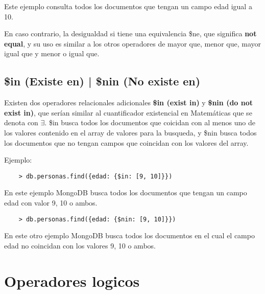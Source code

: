 Este ejemplo consulta todos los documentos que tengan un campo edad igual a 10.

En caso contrario, la desigualdad si tiene una equivalencia \$ne, que significa \textbf{not equal}, y su uso es similar a los otros operadores de mayor que, menor que, mayor igual que y menor o igual que.

\subsection{\$in (Existe en) | \$nin (No existe en)}

Existen dos operadores relacionales adicionales \textbf{\$in (exist in)} y \textbf{\$nin (do not exist in)}, que serían similar al cuantificador existencial en Matemáticas que se denota con $\exists$. \$in busca todos los documentos que coicidan con al menos uno de los valores contenido en el array de valores para la busqueda, y \$nin busca todos los documentos que no tengan campos que coincidan con los valores del array.

Ejemplo:

\begin{lstlisting}
    > db.personas.find({edad: {$in: [9, 10]}})
\end{lstlisting}

En este ejemplo MongoDB busca todos los documentos que tengan un campo edad con valor 9, 10 o ambos.

\begin{lstlisting}
    > db.personas.find({edad: {$nin: [9, 10]}})
\end{lstlisting}

En este otro ejemplo MongoDB busca todos los documentos en el cual el campo edad no coincidan con los valores 9, 10 o ambos.

\section{Operadores logicos}

